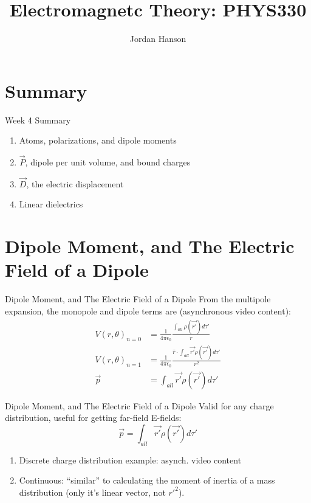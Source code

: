 \documentclass{beamer}
\title{Electromagnetc Theory: PHYS330}
\author{Jordan Hanson}
\institute{Whittier College Department of Physics and Astronomy}
\begin{document}
\maketitle

\section{Summary}

\begin{frame}{Week 4 Summary}
\begin{enumerate}
\item Atoms, polarizations, and dipole moments
\item $\vec{P}$, dipole per unit volume, and bound charges
\item $\vec{D}$, the electric displacement
\item Linear dielectrics
\end{enumerate}
\end{frame}

\section{Dipole Moment, and The Electric Field of a Dipole}

\begin{frame}{Dipole Moment, and The Electric Field of a Dipole}
From the multipole expansion, the monopole and dipole terms are (asynchronous video content):
\begin{align}
V(r,\theta)_{n=0} &= \frac{1}{4\pi\epsilon_0}\frac{\int_{all} \rho(\vec{r'})d\tau'}{r} \\
V(r,\theta)_{n=1} &= \frac{1}{4\pi\epsilon_0}\frac{\hat{r} \cdot \int_{all} \vec{r'} \rho(\vec{r'})d\tau'}{r^2} \\
\vec{p} &= \int_{all} \vec{r'} \rho(\vec{r'})d\tau'
\end{align}
\end{frame}

\begin{frame}{Dipole Moment, and The Electric Field of a Dipole}
Valid for any charge distribution, useful for getting far-field E-fields:
\begin{equation}
\boxed{
\vec{p} = \int_{all} \vec{r'} \rho(\vec{r'})d\tau'
}
\end{equation}
\begin{enumerate}
\item Discrete charge distribution example: asynch. video content
\item Continuous: ``similar'' to calculating the moment of inertia of a mass distribution (only it's linear vector, not $r'^2$).
\end{enumerate}
\end{frame}
\end{document}
